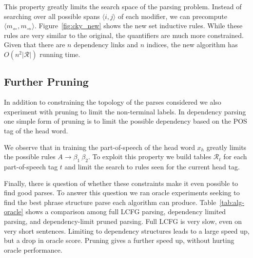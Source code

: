 \documentclass[11pt,letterpaper]{article}
\newcommand{\nonterms}{\mathcal{N}}
\newcommand{\rules}{\mathcal{R}}
\newcommand{\Left}[1]{#1_{\Leftarrow}}
\newcommand{\Right}[1]{#1_{\Rightarrow}}
\newcommand{\Span}[1]{\langle #1 \rangle}
\newcommand{\Rule}[3]{#1 \rightarrow #2\ #3}
\begin{document}
This property greatly limits the search space of the parsing problem.
Instead of searching over all possible spans $\Span{i, j}$ of each modifier, we can
precompute $\langle \Left{m},\Right{m}\rangle$. Figure~\ref{fig:cky_new} shows the new set inductive rules.
While these rules are very similar to the original, the quantifiers are
much more constrained. Given that there are $n$ dependency links and $n$ indices, the new algorithm has $O(n^2|\rules|)$ running time.








\subsection{Further Pruning}
\label{sec:prune}

In addition to constraining the topology of the parses considered we
also experiment with pruning to limit the non-terminal labels.  In
dependency parsing one simple form of pruning is to limit the possible
dependency based on the POS tag of the head word.

We observe that in training the part-of-speech of the head word $x_h$
greatly limits the possible rules $\Rule{A}{\beta_1}{\beta_2}$.  To
exploit this property we build tables $\rules_t$ for each
part-of-speech tag $t$ and limit the search to rules seen for the
current head tag.

Finally, there is question of whether these constraints make it even
possible to find good parses. To answer this question we ran oracle
experiments seeking to find the best phrase structure parse each
algorithm can produce.  Table~\ref{tab:alg-oracle} shows a comparison
among full LCFG parsing, dependency limited parsing, and
dependency-limit pruned parsing. Full LCFG is very slow, even on very
short sentences.  Limiting to dependency structures leads to a large
speed up, but a drop in oracle score. Pruning gives a further speed up,
without hurting oracle performance.
\end{document}

